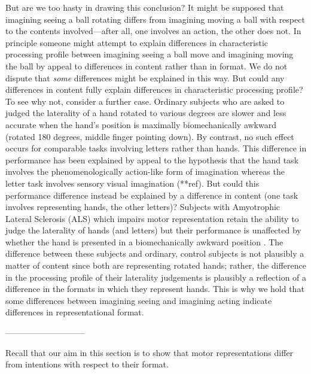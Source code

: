 \documentclass[12pt,\papersize]{extarticle}
\begin{document}
But are we too hasty in drawing this conclusion? It might be supposed that imagining seeing a ball rotating differs from imagining moving a ball with respect to the contents involved---after all, one involves an action, the other does not. In principle someone might attempt to explain differences in characteristic processing profile between imagining seeing a ball move and imagining moving the ball by appeal to differences in content rather than in format. We do not dispute that \emph{some} differences might be explained in this way. But could any differences in content fully explain differences in characteristic processing profile? To see why not, consider a further case. Ordinary subjects who are asked to judged the laterality of a hand rotated to various degrees are slower and less accurate when the hand's position is maximally biomechanically awkward (rotated 180 degrees, middle finger pointing down). By contrast, no such effect occurs for comparable tasks involving letters rather than hands. This difference in performance has been explained by appeal to the hypothesis that the hand task involves the phenomenologically action-like form of imagination whereas the letter task involves sensory visual imagination (**ref).  But could this performance difference instead be explained by a difference in content (one task involves representing hands, the other letters)? Subjects with Amyotrophic Lateral Sclerosis (ALS) which impairs motor representation retain the ability to judge the laterality of hands (and letters) but their performance is unaffected by whether the hand is presented in a biomechanically awkward position \citep{Fiori:2012fk}. The difference between these subjects and ordinary, control subjects is not plausibly a matter of content since both are representing rotated hands; rather, the difference in the processing profile of their laterality judgements is plausibly a reflection of a difference in the formats in which they represent hands. This is why we hold that some differences between imagining seeing and imagining acting indicate differences in representational format. 

-----------------------------

Recall that our aim in this section is to show that motor representations differ from intentions with respect to their format.  

\end{document}
